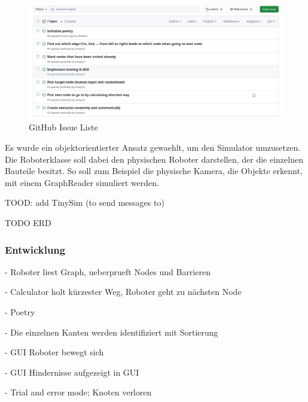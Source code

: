 \begin{figure}[H]
\centering
\includegraphics[width=\textwidth]{img/github-issues.png}
\caption{GitHub Issue Liste}
\label{fig:github-issues}
\end{figure}

Es wurde ein objektorientierter Ansatz gewaehlt, um den Simulator umzusetzen. Die Roboterklasse soll dabei den physischen Roboter darstellen, der die einzelnen Bauteile besitzt. So soll zum Beispiel die physische Kamera, die Objekte erkennt, mit einem GraphReader simuliert werden.

TOOD: add TinySim (to send messages to)

TODO ERD

\subsubsection{Entwicklung}

- Roboter liest Graph, ueberprueft Nodes und Barrieren

- Calculator holt kürzester Weg, Roboter geht zu nächsten Node

- Poetry

- Die einzelnen Kanten werden identifiziert mit Sortierung

- GUI Roboter bewegt sich

- GUI Hindernisse aufgezeigt in GUI

- Trial and error mode; Knoten verloren